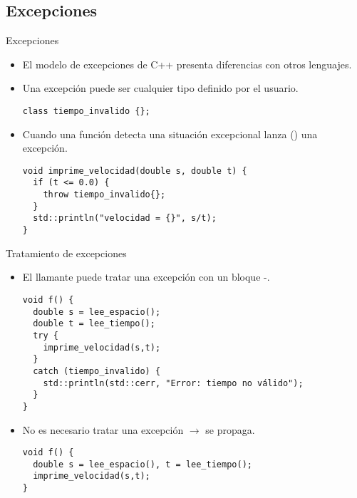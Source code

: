 \subsection{Excepciones}

\begin{frame}[t,fragile]{Excepciones}
\begin{itemize}
  \item El modelo de excepciones de C++ presenta diferencias con
        otros lenguajes.

  \pause\vfill
  \item Una excepción puede ser cualquier tipo definido por el usuario.
\begin{lstlisting}
class tiempo_invalido {};
\end{lstlisting}

  \pause\vfill
  \item Cuando una función detecta una situación excepcional lanza
        () una excepción.
\begin{lstlisting}
void imprime_velocidad(double s, double t) {
  if (t <= 0.0) {
    throw tiempo_invalido{};
  }
  std::println("velocidad = {}", s/t);
}
\end{lstlisting}

\end{itemize}
\end{frame}

\begin{frame}[t,fragile]{Tratamiento de excepciones}
\begin{itemize}
  \item El llamante puede tratar una excepción con un bloque -.
\begin{lstlisting}
void f() {
  double s = lee_espacio();
  double t = lee_tiempo();
  try {
    imprime_velocidad(s,t);
  }
  catch (tiempo_invalido) {
    std::println(std::cerr, "Error: tiempo no válido");
  }
}
\end{lstlisting}
  \vfill\pause
  \item No es necesario tratar una excepción $\rightarrow$ se propaga.
\begin{lstlisting}
void f() {
  double s = lee_espacio(), t = lee_tiempo();
  imprime_velocidad(s,t);
}
\end{lstlisting}
\end{itemize}
\end{frame}

